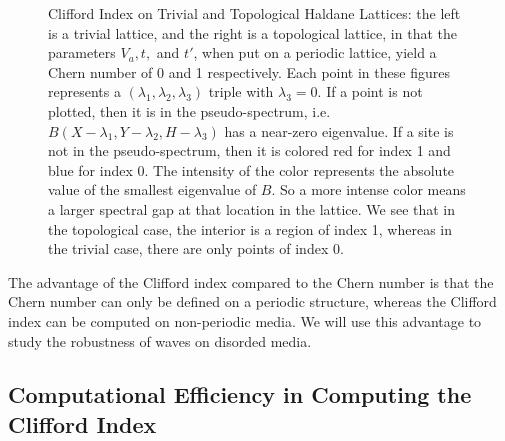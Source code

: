 \documentclass[a4paper]{article}
\begin{document}
\begin{figure}
\centering
{}%
%
\caption{Clifford Index on Trivial and Topological Haldane Lattices: the left is a trivial lattice, and the right is a topological lattice, in that the parameters $V_a, t,$ and $t'$, when put on a periodic lattice, yield a Chern number of 0 and 1 respectively.
Each point in these figures represents a $(\lambda_1,\lambda_2,\lambda_3)$ triple with $\lambda_3 = 0$.
If a point is not plotted, then it is in the pseudo-spectrum, i.e. $B(X - \lambda_1, Y - \lambda_2, H - \lambda_3)$ has a near-zero eigenvalue.
If a site is not in the pseudo-spectrum, then it is colored red for index 1 and blue for index 0.
The intensity of the color represents the absolute value of the smallest eigenvalue of $B$.
So a more intense color means a larger spectral gap at that location in the lattice.
We see that in the topological case, the interior is a region of index 1, whereas in the trivial case, there are only points of index 0.
}%
\label{fig:haldane_index}%
\end{figure}
The advantage of the Clifford index compared to the Chern number is that the Chern number can only be defined on a periodic structure, whereas the Clifford index can be computed on non-periodic media.
We will use this advantage to study the robustness of waves on disorded media.

\subsection{Computational Efficiency in Computing the Clifford Index}
\end{document}
